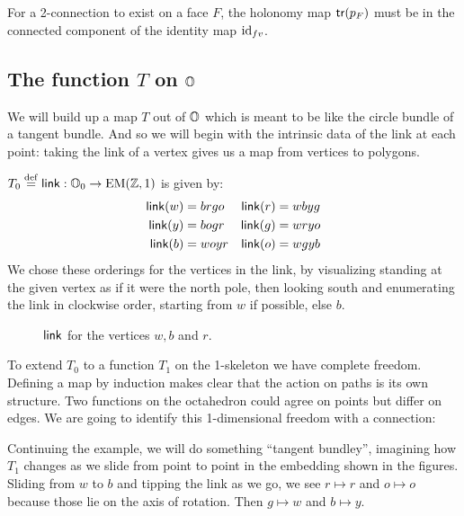 For a 2-connection to exist on a face \( F \), the holonomy map \( \mathsf{tr}(p_F) \) must be in the connected component of the identity map \( \text{id}_{fv} \).

\subsection{The function \texorpdfstring{\( T \)}{T} on \texorpdfstring{\( \mathbb{O} \)}{O}}

We will build up a map \( T \) out of \( \mathbb{O} \) which is meant to be like the circle bundle of a tangent bundle. And so we will begin with the intrinsic data of the link at each point: taking the link of a vertex gives us a map from vertices to polygons.

\begin{mydef}
\( T_0\stackrel{\mathrm{def}}{=}\operatorname{\mathsf{link}}:\mathbb{O}_0\to\mathrm{EM}(\mathbb{Z},1) \) is given by:
\begin{align*}
\operatorname{\mathsf{link}}(w) &= brgo & \operatorname{\mathsf{link}}(r) &= wbyg \\
\operatorname{\mathsf{link}}(y) &= bogr & \operatorname{\mathsf{link}}(g) &= wryo \\
\operatorname{\mathsf{link}}(b) &= woyr & \operatorname{\mathsf{link}}(o) &= wgyb
\end{align*}
We chose these orderings for the vertices in the link, by visualizing standing at the given vertex as if it were the north pole, then looking south and enumerating the link in clockwise order, starting from \( w \) if possible, else \( b \).
\end{mydef}

\begin{figure}[htbp]
\centering

\caption{\( \operatorname{\mathsf{link}} \) for the vertices \( w, b\) and \( r \).}
\label{fig:triangle_of_equators}
\end{figure}

To extend \( T_0 \) to a function \( T_1 \) on the 1-skeleton we have complete freedom. Defining a map by induction makes clear that the action on paths is its own structure. Two functions on the octahedron could agree on points but differ on edges. We are going to identify this 1-dimensional freedom with a connection:

Continuing the example, we will do something ``tangent bundley'', imagining how \( T_1 \) changes as we slide from point to point in the embedding shown in the figures. Sliding from \( w \) to \( b \) and tipping the link as we go, we see \( r\mapsto r \) and \( o\mapsto o \) because those lie on the axis of rotation. Then \( g\mapsto w \) and \( b\mapsto y \). 

